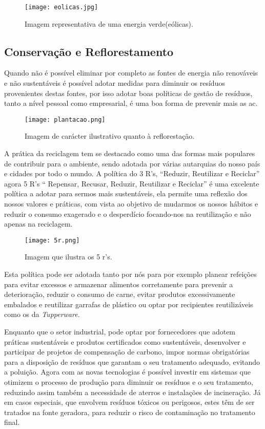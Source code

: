 \documentclass{report}
\begin{document}
\begin{figure}[H]
	\centering
	\texttt{[image: eolicas.jpg]}
	\caption{Imagem representativa de uma energia verde(eólicas).}
	\label{fig:eolicas}
\end{figure}

\subsection{Conservação e Reflorestamento}

Quando não é possível eliminar por completo as fontes de energia não renováveis e não sustentáveis é possível adotar medidas para diminuir os resíduos provenientes destas fontes, por isso adotar boas políticas de gestão de resíduos, tanto a nível pessoal como empresarial, é uma boa forma de prevenir mais as \ac{ac}.

\begin{figure}[H]
	\centering
	\texttt{[image: plantacao.png]}
	\caption{Imagem de carácter ilustrativo quanto à reflorestação.}
	\label{fig:plantacao}
\end{figure}

A prática da reciclagem tem se destacado como uma das formas mais populares de contribuir para o ambiente, sendo adotada por várias autarquias do nosso país e cidades por todo o mundo. A política do 3 R’s, “Reduzir, Reutilizar e Reciclar” agora 5 R’s “ Repensar, Recusar, Reduzir, Reutilizar e Reciclar” é uma excelente política a adotar para sermos mais sustentáveis, ela permite uma reflexão dos nossos valores e práticas, com vista ao objetivo de mudarmos os nossos hábitos e reduzir o consumo exagerado e o desperdício focando-nos na reutilização e não apenas na reciclagem. 

\begin{figure}[H]
	\centering
	\texttt{[image: 5r.png]}
	\caption{Imagem que ilustra os 5 r's.}
	\label{fig:5rs}
\end{figure}

Esta política pode ser adotada tanto por nós para por exemplo planear refeições para evitar excessos e armazenar alimentos corretamente para prevenir a deterioração, reduzir o consumo de carne, evitar produtos excessivamente embalados e reutilizar garrafas de plástico ou optar por recipientes reutilizáveis como os da \textit{Tupperware}. 

Enquanto que o setor industrial, pode optar por fornecedores que adotem práticas sustentáveis e produtos certificados como sustentáveis, desenvolver e participar de projetos de compensação de carbono, impor normas obrigatórias para a disposição de resíduos que garantam o seu tratamento adequado, evitando a poluição. Agora com as novas tecnologias é possível investir em sistemas que otimizem o processo de produção para diminuir os resíduos e o seu tratamento, reduzindo assim também a necessidade de aterros e instalações de incineração. Já em casos especiais, que envolvem resíduos tóxicos ou perigosos, estes têm de ser tratados na fonte geradora, para reduzir o risco de contaminação no tratamento final. 
\end{document}
